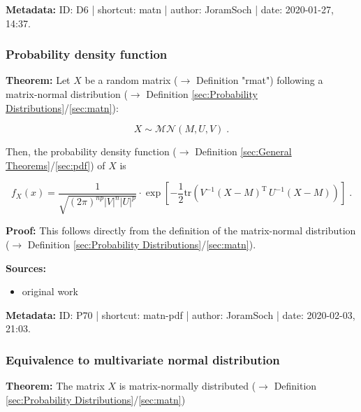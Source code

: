 \documentclass[a4paper,12pt]{book}
\begin{document}
\vspace{1em}
\textbf{Metadata:} ID: D6 | shortcut: matn | author: JoramSoch | date: 2020-01-27, 14:37.


\subsubsection[\textbf{Probability density function}]{Probability density function} \label{sec:matn-pdf}

\vspace{1em}
\textbf{Theorem:} Let $X$ be a random matrix ($\rightarrow$ Definition "rmat") following a matrix-normal distribution ($\rightarrow$ Definition \ref{sec:Probability Distributions}/\ref{sec:matn}):

\begin{equation} \label{eq:matn-pdf-matn}
X \sim \mathcal{MN}(M, U, V) \; .
\end{equation}

Then, the probability density function ($\rightarrow$ Definition \ref{sec:General Theorems}/\ref{sec:pdf}) of $X$ is

\begin{equation} \label{eq:matn-pdf-matn-pdf}
f_X(x) = \frac{1}{\sqrt{(2\pi)^{np} |V|^n |U|^p}} \cdot \exp\left[-\frac{1}{2} \mathrm{tr}\left( V^{-1} (X-M)^\mathrm{T} \, U^{-1} (X-M) \right) \right] \; .
\end{equation}


\vspace{1em}
\textbf{Proof:} This follows directly from the definition of the matrix-normal distribution ($\rightarrow$ Definition \ref{sec:Probability Distributions}/\ref{sec:matn}).

\vspace{1em}
\textbf{Sources:}
\begin{itemize}
\item original work\end{itemize}


\vspace{1em}
\textbf{Metadata:} ID: P70 | shortcut: matn-pdf | author: JoramSoch | date: 2020-02-03, 21:03.


\subsubsection[\textbf{Equivalence to multivariate normal distribution}]{Equivalence to multivariate normal distribution} \label{sec:matn-mvn}

\vspace{1em}
\textbf{Theorem:} The matrix $X$ is matrix-normally distributed ($\rightarrow$ Definition \ref{sec:Probability Distributions}/\ref{sec:matn})
\end{document}
